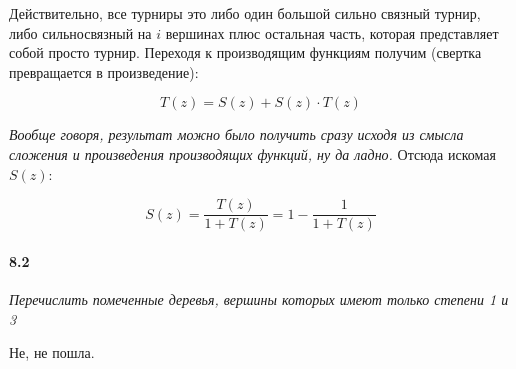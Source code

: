 \documentclass[russian]{article}
\begin{document}
Действительно, все турниры это либо один большой сильно связный турнир, либо сильносвязный на $i$ вершинах плюс остальная часть, которая представляет собой просто турнир. Переходя к производящим функциям получим (свертка превращается в произведение):

\[
T(z) = S(z) + S(z) \cdot T(z)
\]

\textit{Вообще говоря, результат можно было получить сразу исходя из смысла сложения и произведения производящих функций, ну да ладно.} Отсюда искомая $S(z)$:

\[
S(z) = \frac{T(z)}{1+T(z)} = 1 - \frac{1}{1+T(z)}
\]

\paragraph*{8.2}

\textit{Перечислить помеченные деревья, вершины которых имеют только степени 1 и 3}

Не, не пошла.
\end{document}
